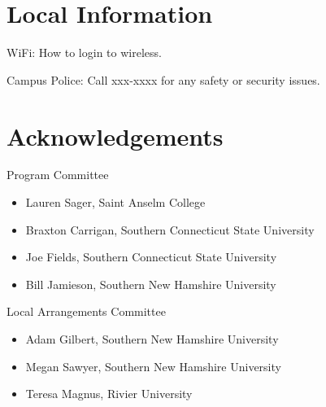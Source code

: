\documentclass[10pt,]{article}
\theoremstyle{plain}
\begin{document}
\section[{Local Information}]{Local Information}\label{section-5}
\hypertarget{p-26}{}%
WiFi: How to login to wireless.%
\par
\hypertarget{p-27}{}%
Campus Police: Call xxx-xxxx for any safety or security issues.%
\par
\hypertarget{p-28}{}%
%
\typeout{************************************************}
\typeout{************************************************}
\section[{Acknowledgements}]{Acknowledgements}\label{section-6}
\hypertarget{p-29}{}%
Program Committee%
\par
\hypertarget{p-30}{}%
\leavevmode%
\begin{itemize}[label=\textbullet]
\item{}Lauren Sager, Saint Anselm College%
\item{}Braxton Carrigan, Southern Connecticut State University%
\item{}Joe Fields, Southern Connecticut State University%
\item{}Bill Jamieson, Southern New Hamshire University%
\end{itemize}
%
\par
\hypertarget{p-31}{}%
Local Arrangements Committee%
\par
\hypertarget{p-32}{}%
\leavevmode%
\begin{itemize}[label=\textbullet]
\item{}Adam Gilbert, Southern New Hamshire University%
\item{}Megan Sawyer, Southern New Hamshire University%
\item{}Teresa Magnus, Rivier University%
\end{itemize}
%
\end{document}
